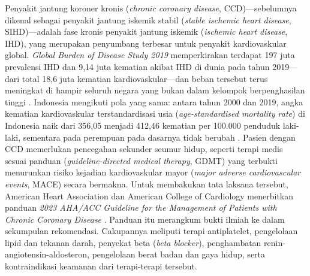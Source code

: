 Penyakit jantung koroner kronis (\emph{chronic coronary disease}, CCD)---sebelumnya
dikenal sebagai penyakit jantung iskemik stabil (\emph{stable ischemic heart disease},
SIHD)---adalah fase kronis penyakit jantung iskemik (\emph{ischemic heart disease},
IHD), yang merupakan penyumbang terbesar untuk penyakit kardiovaskular global. \emph{Global
Burden of Disease Study 2019} memperkirakan terdapat 197 juta prevalensi IHD dan
9,14 juta kematian akibat IHD di dunia pada tahun 2019---dari total 18,6 juta kematian
kardiovaskular---dan beban tersebut terus meningkat di hampir seluruh negara yang bukan dalam
kelompok berpenghasilan tinggi \cite{gbd2019_cvd}. Indonesia mengikuti pola yang sama:
antara tahun 2000 dan 2019, angka kematian kardiovaskular terstandardisasi usia
(\emph{age-standardised mortality rate}) di Indonesia
naik dari 356,05 menjadi 412,46 kematian per 100.000 penduduk laki-laki,
sementara pada perempuan pada dasarnya tidak berubah \cite{gbd_indonesia_cvd}.
Pasien dengan CCD memerlukan pencegahan sekunder seumur hidup,
seperti terapi medis sesuai panduan (\emph{guideline-directed medical therapy}, GDMT) yang terbukti
menurunkan risiko kejadian kardiovaskular mayor (\emph{major adverse cardiovascular events},
MACE) secara bermakna. Untuk membakukan tata laksana tersebut, American Heart Association dan American College of
Cardiology menerbitkan panduan \emph{2023 AHA/ACC Guideline for the Management of Patients
with Chronic Coronary Disease} \cite{virani2023}. Panduan itu merangkum bukti ilmiah ke
dalam sekumpulan rekomendasi. Cakupannya meliputi terapi antiplatelet, pengelolaan lipid dan
tekanan darah, penyekat beta (\emph{beta blocker}), penghambatan
renin-angiotensin-aldosteron, pengelolaan berat badan dan gaya hidup, serta kontraindikasi
keamanan dari terapi-terapi tersebut.

